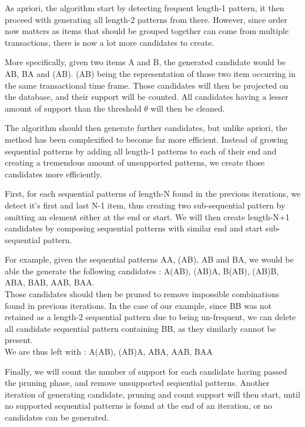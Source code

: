 \documentclass{eplmastersthesis}
\begin{document}
As apriori, the algorithm start by detecting frequent length-1 pattern, it then proceed with generating all length-2 patterns from there. However, since order now matters as items that should be grouped together can come from multiple transactions, there is now a lot more candidates to create. \newline

More specifically, given two items A and B, the generated candidate would be AB, BA and (AB). (AB) being the representation of those two item occurring in the same transactional time frame. Those candidates will then be projected on the database, and their support will be counted. All candidates having a lesser amount of support than the threshold $\theta$ will then be cleaned. \newline

The algorithm should then generate further candidates, but unlike apriori, the method has been complexified to become far more efficient. Instead of growing sequential patterns by adding all length-1 patterns to each of their end and creating a tremendous amount of unsupported patterns, we create those candidates more efficiently. \newline

First, for each sequential patterns of length-N found in the previous iterations, we detect it's first and last N-1 item, thus creating two sub-sequential pattern by omitting an element either at the end or start. We will then create length-N+1 candidates by composing sequential patterns with similar end and start sub-sequential pattern. \newline

For example, given the sequential patterns AA, (AB), AB and BA, we would be able the generate the following candidates : A(AB), (AB)A, B(AB), (AB)B, ABA, BAB, AAB, BAA. \\
Those candidates should then be pruned to remove impossible combinations found in previous iterations. In the case of our example, since BB was not retained as a length-2 sequential pattern due to being un-frequent, we can delete all candidate sequential pattern containing BB, as they similarly cannot be present. \\
We are thus left with : A(AB), (AB)A, ABA, AAB, BAA \newline

Finally, we will count the number of support for each candidate having passed the pruning phase, and remove unsupported sequential patterns. Another iteration of generating candidate, pruning and count support will then start, until no supported sequential patterns is found at the end of an iteration, or no candidates can be generated. \newline
\end{document}
